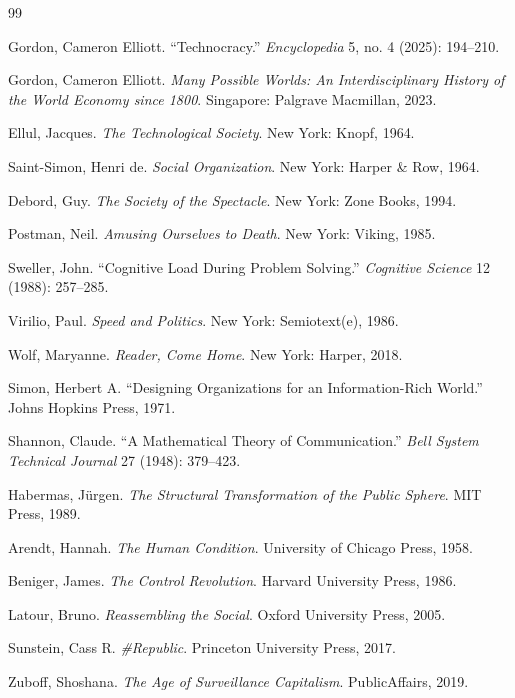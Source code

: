 \documentclass[12pt]{article}
\begin{document}
\newpage
\begin{thebibliography}{99}

Gordon, Cameron Elliott.
``Technocracy.''
\textit{Encyclopedia} 5, no. 4 (2025): 194–210.

Gordon, Cameron Elliott.
\textit{Many Possible Worlds: An Interdisciplinary History of the World Economy since 1800}.
Singapore: Palgrave Macmillan, 2023.

Ellul, Jacques.
\textit{The Technological Society}.
New York: Knopf, 1964.

Saint-Simon, Henri de.
\textit{Social Organization}.
New York: Harper \& Row, 1964.

Debord, Guy.
\textit{The Society of the Spectacle}.
New York: Zone Books, 1994.

Postman, Neil.
\textit{Amusing Ourselves to Death}.
New York: Viking, 1985.

Sweller, John.
``Cognitive Load During Problem Solving.''
\textit{Cognitive Science} 12 (1988): 257–285.

Virilio, Paul.
\textit{Speed and Politics}.
New York: Semiotext(e), 1986.

Wolf, Maryanne.
\textit{Reader, Come Home}.
New York: Harper, 2018.

Simon, Herbert A.
``Designing Organizations for an Information-Rich World.''
Johns Hopkins Press, 1971.

Shannon, Claude.
``A Mathematical Theory of Communication.''
\textit{Bell System Technical Journal} 27 (1948): 379–423.

Habermas, Jürgen.
\textit{The Structural Transformation of the Public Sphere}.
MIT Press, 1989.

Arendt, Hannah.
\textit{The Human Condition}.
University of Chicago Press, 1958.

Beniger, James.
\textit{The Control Revolution}.
Harvard University Press, 1986.

Latour, Bruno.
\textit{Reassembling the Social}.
Oxford University Press, 2005.

Sunstein, Cass R.
\textit{\#Republic}.
Princeton University Press, 2017.

Zuboff, Shoshana.
\textit{The Age of Surveillance Capitalism}.
PublicAffairs, 2019.

\end{thebibliography}
\end{document}
